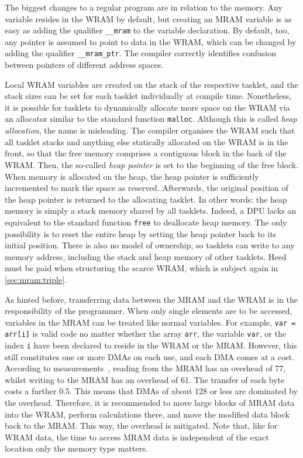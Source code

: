 The biggest changes to a regular \langC{} program are in relation to the memory.
Any variable resides in the \ac{WRAM} by default, but creating an \ac{MRAM} variable is as easy as adding the qualifier \lstinline|__mram| to the variable declaration.
By default, too, any pointer is assumed to point to data in the \ac{WRAM}, which can be changed by adding the qualifier \lstinline|__mram_ptr|.
The compiler correctly identifies confusion between pointers of different address spaces.

Local \ac{WRAM} variables are created on the stack of the respective tasklet, and the stack sizes can be set for each tasklet individually at compile time.
Nonetheless, it is possible for tasklets to dynamically allocate more space on the \ac{WRAM} via an allocator similar to the standard \langC{} function \lstinline|malloc|.
Although this is called \emph{heap allocation}, the name is misleading.
The compiler organises the \ac{WRAM} such that all tasklet stacks and anything else statically allocated on the \ac{WRAM} is in the front, so that the free memory comprises a contiguous block in the back of the \ac{WRAM}.
Then, the so-called \emph{heap pointer} is set to the beginning of the free block.
When memory is allocated on the heap, the heap pointer is sufficiently incremented to mark the space as reserved.
Afterwards, the original position of the heap pointer is returned to the allocating tasklet.
In other words:
the heap memory is simply a stack memory shared by all tasklets.
Indeed, a \ac{DPU} lacks an equivalent to the standard \langC{} function \lstinline|free| to deallocate heap memory.
The only possibility is to reset the entire heap by setting the heap pointer back to its initial position.
There is also no model of ownership, so tasklets can write to any memory address, including the stack and heap memory of other tasklets.
Heed must be paid when structuring the scarce \ac{WRAM}, which is subject again in \cref{sec:mram:triple}.

As hinted before, transferring data between the \ac{MRAM} and the \ac{WRAM} is in the responsibility of the programmer.
When only single elements are to be accessed, variables in the \ac{MRAM} can be treated like normal variables.
For example, \lstinline|var = arr[i]| is valid code no matter whether the array \lstinline|arr|, the variable \lstinline|var|, or the index \lstinline|i| have been declared to reside in the WRAM or the MRAM.
However, this still constitutes one or more \acp{DMA} on each use, and each \ac{DMA} comes at a cost.
According to measurements~\cite{mutlu2022Benchmarking}, reading from the \ac{MRAM} has an overhead of \qty{77}{\cycles}, whilst writing to the \ac{MRAM} has an overhead of \qty{61}{\cycles}.
The transfer of each byte costs a further \qty{0.5}{\cycles}.
This means that \acp{DMA} of about \qty{128}{\byte} or less are dominated by the overhead.
Therefore, it is recommended to move large blocks of \ac{MRAM} data into the \ac{WRAM}, perform calculations there, and move the modified data block back to the \ac{MRAM}.
This way, the overhead is mitigated.
Note that, like for \ac{WRAM} data, the time to access \ac{MRAM} data is independent of the exact location \Dash only the memory type matters.

